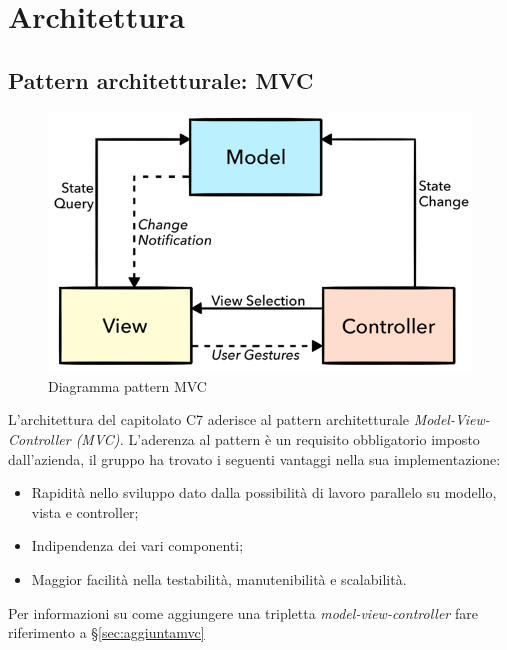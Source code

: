 \section{Architettura}
\subsection{Pattern architetturale: MVC}
\begin{figure}[H]
    \centering
    \includegraphics[scale = 1]{components/img/mvc-generico.png}
    \caption{Diagramma pattern MVC}
    \label{fig:diagramma MVC generico}
\end{figure}
L'architettura del capitolato C7 aderisce al pattern architetturale \textit{Model-View-Controller (MVC).} L'aderenza al pattern è un requisito obbligatorio imposto dall'azienda, il gruppo ha trovato i seguenti vantaggi nella sua implementazione:

\begin{itemize}
    \item Rapidità nello sviluppo  dato dalla possibilità di lavoro parallelo su modello, vista e controller;
    \item Indipendenza dei vari componenti;
    \item Maggior facilità nella testabilità, manutenibilità e scalabilità.
\end{itemize}
Per informazioni su come aggiungere una tripletta \textit{model-view-controller} fare riferimento a \S{}\ref{sec:aggiuntamvc}


